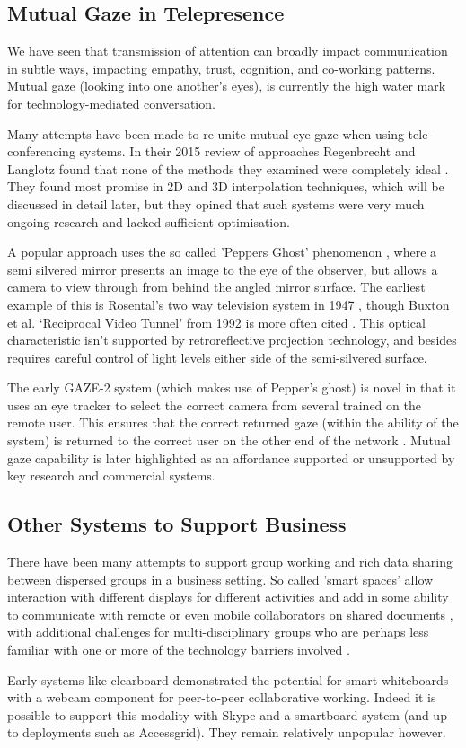                   \subsection{Mutual Gaze in Telepresence}
          We have seen that transmission of attention can broadly impact communication in subtle ways, impacting empathy, trust, cognition, and co-working patterns. Mutual gaze (looking into one another's eyes), is currently the high water mark for technology-mediated conversation.\par
          Many attempts have been made to re-unite mutual eye gaze when using tele-conferencing systems. In their 2015 review of approaches Regenbrecht and Langlotz found that none of the methods they examined were completely ideal \cite{Regenbrecht2015}. They found most promise in 2D and 3D interpolation techniques, which will be discussed in detail later, but they opined that such systems were very much ongoing research and lacked sufficient optimisation.\par
          A popular approach uses the so called 'Peppers Ghost' phenomenon \cite{steinmeyer2013science}, where a semi silvered mirror presents an image to the eye of the observer, but allows a camera to view through from behind the angled mirror surface. The earliest example of this is Rosental's two way television system in 1947 \cite{rosenthal1947two}, though Buxton et al. `Reciprocal Video Tunnel' from 1992 is more often cited \cite{buxton1992telepresence}. This optical characteristic isn't supported by retroreflective projection technology, and besides requires careful control of light levels either side of the semi-silvered surface.\par  
The early GAZE-2 system (which makes use of Pepper's ghost) is novel in that it uses an eye tracker to select the correct camera from several trained on the remote user. This ensures that the correct returned gaze (within the ability of the system) is returned to the correct user on the other end of the network \cite{Vertegaal2003}.
Mutual gaze capability is later highlighted as an affordance supported or unsupported by key research and commercial systems.                           
\subsection{Other Systems to Support Business}                  
There have been many attempts to support group working and rich data sharing between dispersed groups in a business setting. So called 'smart spaces' allow interaction with different displays for different activities and add in some ability to communicate with remote or even mobile collaborators on shared documents \cite{Bardram2012}, with additional challenges for multi-disciplinary groups who are perhaps less familiar with one or more of the technology barriers involved \cite{Adamczyk2007}.\par
Early systems like clearboard \cite{Ishii1993} demonstrated the potential for smart whiteboards with a webcam component for peer-to-peer collaborative working. Indeed it is possible to support this modality with Skype and a smartboard system (and up to deployments such as Accessgrid). They remain relatively unpopular however.\par
